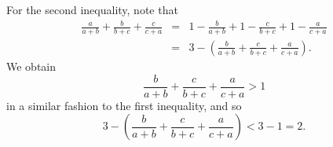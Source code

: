 \documentclass{article}
\begin{document}
\begin{enumerate}
For the second inequality, note that 
\begin{eqnarray*}
\frac{a}{a+b} + \frac{b}{b+c} + \frac{c}{c+a} &=& 1-\frac{b}{a+b} + 1-\frac{c}{b+c} + 1-\frac{a}{c+a} \\
&=& 3-\left(\frac{b}{a+b} + \frac{c}{b+c} + \frac{a}{c+a}\right).
\end{eqnarray*}
We obtain 
$$\frac{b}{a+b} + \frac{c}{b+c} + \frac{a}{c+a} > 1$$ in a similar fashion to the first inequality, and so 
$$3-\left(\frac{b}{a+b} + \frac{c}{b+c} + \frac{a}{c+a}\right) < 3-1 = 2.$$

\end{enumerate}
\end{document}
